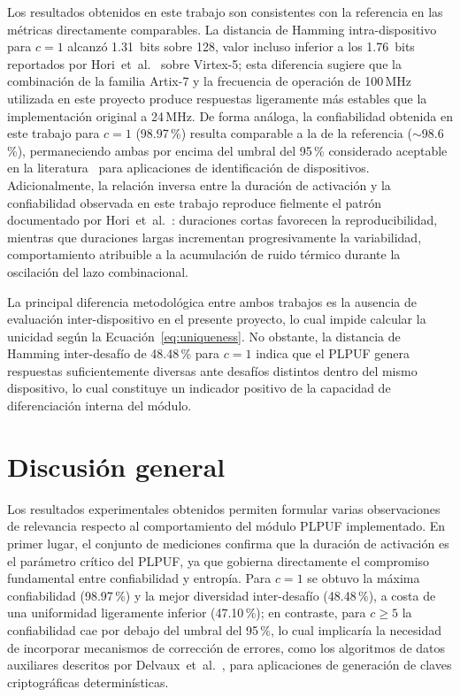 Los resultados obtenidos en este trabajo son consistentes con la referencia
en las métricas directamente comparables. La distancia de Hamming
intra-dispositivo para $c = 1$ alcanzó 1.31~bits sobre 128, valor incluso
inferior a los 1.76~bits reportados por Hori~et~al.~\cite{hori_2011_pseudolfsr}
sobre Virtex-5; esta diferencia sugiere que la combinación de la familia
Artix-7 y la frecuencia de operación de 100\,MHz utilizada en este proyecto
produce respuestas ligeramente más estables que la implementación original a
24\,MHz. De forma análoga, la confiabilidad obtenida en este trabajo para
$c = 1$ (98.97\,\%) resulta comparable a la de la referencia
($\sim$98.6\,\%), permaneciendo ambas por encima del umbral del 95\,\%
considerado aceptable en la literatura~\cite{maiti_2012_systematic} para
aplicaciones de identificación de dispositivos. Adicionalmente, la relación
inversa entre la duración de activación y la confiabilidad observada en este
trabajo reproduce fielmente el patrón documentado por
Hori~et~al.~\cite{hori_2011_pseudolfsr}: duraciones cortas favorecen la
reproducibilidad, mientras que duraciones largas incrementan progresivamente
la variabilidad, comportamiento atribuible a la acumulación de ruido térmico
durante la oscilación del lazo combinacional.

La principal diferencia metodológica entre ambos trabajos es la ausencia de
evaluación inter-dispositivo en el presente proyecto, lo cual impide
calcular la unicidad según la Ecuación~\ref{eq:uniqueness}. No obstante, la
distancia de Hamming inter-desafío de 48.48\,\% para $c = 1$ indica que el
PLPUF genera respuestas suficientemente diversas ante desafíos distintos
dentro del mismo dispositivo, lo cual constituye un indicador positivo
de la capacidad de diferenciación interna del módulo.

\section{Discusión general}
\label{sec:res_discusion}

Los resultados experimentales obtenidos permiten formular varias
observaciones de relevancia respecto al comportamiento del módulo PLPUF
implementado. En primer lugar, el conjunto de mediciones confirma que la
duración de activación es el parámetro crítico del PLPUF, ya que gobierna
directamente el compromiso fundamental entre confiabilidad y entropía. Para
$c = 1$ se obtuvo la máxima confiabilidad (98.97\,\%) y la mejor diversidad
inter-desafío (48.48\,\%), a costa de una uniformidad ligeramente inferior
(47.10\,\%); en contraste, para $c \geq 5$ la confiabilidad cae por debajo
del umbral del 95\,\%, lo cual implicaría la necesidad de incorporar
mecanismos de corrección de errores, como los algoritmos de datos auxiliares
descritos por Delvaux~et~al.~\cite{delvaux_2015_helper}, para aplicaciones
de generación de claves criptográficas determinísticas.

